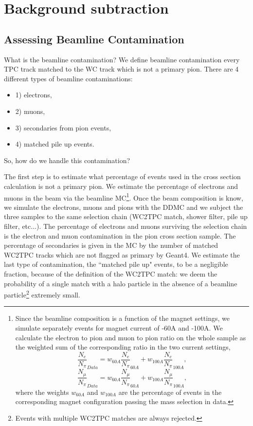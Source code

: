 \chapter{Background subtraction}
\section{Assessing Beamline Contamination}
What is the beamline contamination? We define beamline contamination every TPC track matched to the WC track which is not a primary pion. There are 4 different types of beamline contaminations:
\begin{itemize}
\item[]1) electrons,
\item[]2) muons,
\item[]3) secondaries from pion events,
\item[]4) matched pile up events.
\end{itemize}

So, how do we handle this contamination?

The first step is to estimate what percentage of events used in the cross section calculation is not a primary pion.  
We estimate the percentage of electrons and muons in the beam via the beamline MC\footnote{Since the beamline composition is a function of the magnet settings, we simulate separately events for magnet current of -60A and -100A. 
We calculate the electron to pion and muon to pion ratio on the whole sample as the weighted sum of the corresponding ratio in the two current settings, 
\begin{equation}
\frac{N_e}{N_\pi}_{Data} = w_{60A}\frac{N_e}{N_\pi}_{60A}  + w_{100A}\frac{N_e}{N_\pi}_{100A},
\end{equation}
\begin{equation}
\frac{N_\mu}{N_\pi}_{Data} = w_{60A}\frac{N_\mu}{N_\pi}_{60A}  + w_{100A}\frac{N_\mu}{N_\pi}_{100A},
\end{equation}
where the weights $w_{60A}$ and $w_{100A}$ are the percentage of events in the corresponding magnet configuration passing the mass selection in data. }.
Once the beam composition is know,  we simulate the electrons, muons and pions with the DDMC and we subject the three samples to the same selection chain (WC2TPC match, shower filter, pile up filter, etc...). The percentage of electrons and muons surviving the selection chain is the  electron and muon contamination in the pion cross section sample.
The percentage of secondaries is given in the MC by the number of matched WC2TPC tracks which are not flagged as primary by Geant4.
We estimate the last type of contamination, the ``matched pile up" events, to be a negligible fraction, because of the definition of the WC2TPC match: we deem the probability of a single match with a halo particle in the absence of a beamline particle\footnote{ Events with multiple WC2TPC matches are always rejected.} extremely small.

